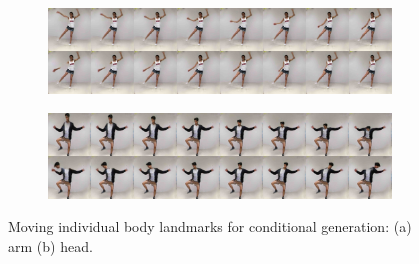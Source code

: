 	\begin{figure}[htp]
		\centering
		\begin{subfigure}{1.\linewidth}
			\includegraphics[trim={0cm 0cm 0cm 0cm},clip, width=1.0\linewidth]{fig/factor/8arm}\caption{}
		\end{subfigure}
		\begin{subfigure}{1.\linewidth}
			\includegraphics[trim={0cm 0cm 0cm 0cm},clip, width=1.0\linewidth]{fig/factor/8head}\caption{}
		\end{subfigure}
		\caption{Moving individual body landmarks for conditional generation: (a) arm (b) head.}
		\label{fig:movekp}
	\end{figure}

